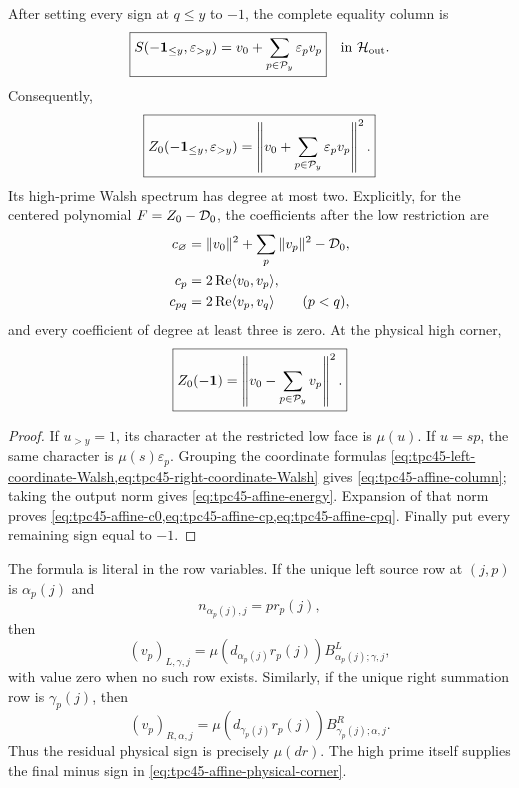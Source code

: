 \begin{theorem}
\label{thm:tpc45-physical-low-affine}
After setting every sign at \(q\le y\) to \(-1\), the complete equality
column is
\begin{equation}
 \boxed{
 S(-\mathbf 1_{\le y},\varepsilon_{>y})
 =v_0+\sum_{p\in\mathcal P_y}\varepsilon_pv_p}
 \quad\text{in }\mathcal H_{\rm out}.
 \label{eq:tpc45-affine-column}
\end{equation}
Consequently,
\begin{equation}
 \boxed{
 Z_0(-\mathbf 1_{\le y},\varepsilon_{>y})
 =\left\|v_0+\sum_{p\in\mathcal P_y}\varepsilon_pv_p\right\|^2.}
 \label{eq:tpc45-affine-energy}
\end{equation}
Its high-prime Walsh spectrum has degree at most two.  Explicitly, for
the centered polynomial \(F=Z_0-\mathcal D_0\), the coefficients after the low
restriction are
\begin{align}
 c_\varnothing
 &=\|v_0\|^2+\sum_p\|v_p\|^2-\mathcal D_0,
 \label{eq:tpc45-affine-c0}\\
 c_p&=2\operatorname{Re}\langle v_0,v_p\rangle,
 \label{eq:tpc45-affine-cp}\\
 c_{pq}&=2\operatorname{Re}\langle v_p,v_q\rangle
 \qquad(p<q),
 \label{eq:tpc45-affine-cpq}
\end{align}
and every coefficient of degree at least three is zero.  At the physical
high corner,
\begin{equation}
 \boxed{Z_0(-\mathbf 1)=\left\|v_0-\sum_{p\in\mathcal P_y}v_p\right\|^2.}
 \label{eq:tpc45-affine-physical-corner}
\end{equation}
\end{theorem}

\begin{proof}
If \(u_{>y}=1\), its character at the restricted low face is
\(\mu(u)\).  If \(u=sp\), the same character is
\(\mu(s)\varepsilon_p\).  Grouping the coordinate formulas
\cref{eq:tpc45-left-coordinate-Walsh,eq:tpc45-right-coordinate-Walsh}
gives \eqref{eq:tpc45-affine-column}; taking the output norm gives
\eqref{eq:tpc45-affine-energy}.  Expansion of that norm proves
\cref{eq:tpc45-affine-c0,eq:tpc45-affine-cp,eq:tpc45-affine-cpq}.
Finally put every remaining sign equal to \(-1\).
\end{proof}

The formula is literal in the row variables.  If the unique left source
row at \((j,p)\) is \(\alpha_p(j)\) and
\begin{equation}
 n_{\alpha_p(j),j}=p r_p(j),
 \label{eq:tpc45-left-pr}
\end{equation}
then
\begin{equation}
 (v_p)_{L,\gamma,j}
 =\mu(d_{\alpha_p(j)}r_p(j))
  B^L_{\alpha_p(j);\gamma,j},
 \label{eq:tpc45-vp-left-actual}
\end{equation}
with value zero when no such row exists.  Similarly, if the unique right
summation row is \(\gamma_p(j)\), then
\begin{equation}
 (v_p)_{R,\alpha,j}
 =\mu(d_{\gamma_p(j)}r_p(j))
  B^R_{\gamma_p(j);\alpha,j}.
 \label{eq:tpc45-vp-right-actual}
\end{equation}
Thus the residual physical sign is precisely \(\mu(dr)\).  The high
prime itself supplies the final minus sign in
\eqref{eq:tpc45-affine-physical-corner}.

